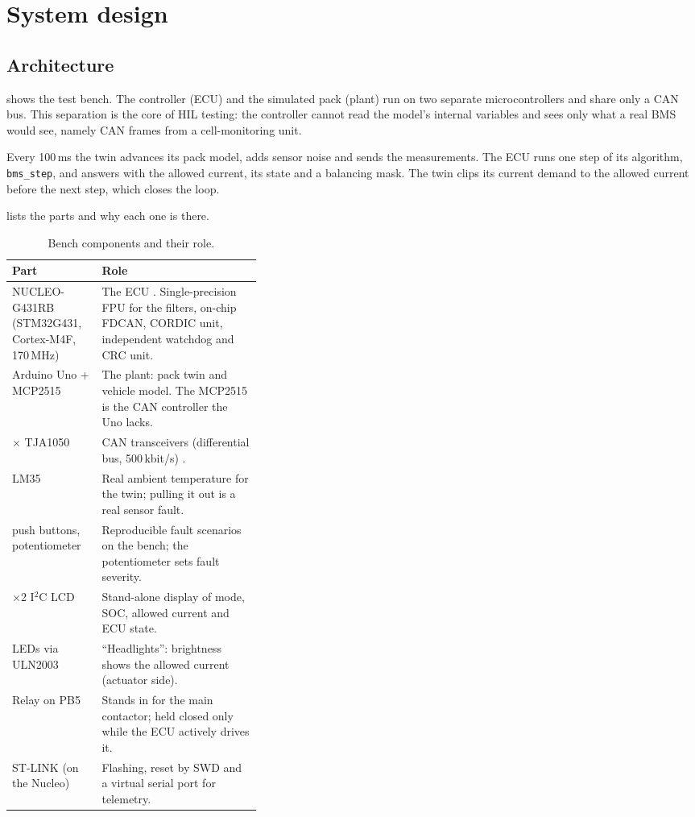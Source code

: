 \chapter{System design}\label{ch:design}

\section{Architecture}
 shows the test bench. The controller (ECU) and the simulated pack (plant) run on two separate microcontrollers and share only a CAN bus. This separation is the core of HIL testing: the controller cannot read the model's internal variables and sees only what a real BMS would see, namely CAN frames from a cell-monitoring unit.


Every 100\,ms the twin advances its pack model, adds sensor noise and sends the measurements. The ECU runs one step of its algorithm, \texttt{bms\_step}, and answers with the allowed current, its state and a balancing mask. The twin clips its current demand to the allowed current before the next step, which closes the loop.

 lists the parts and why each one is there.

\begin{table}[htbp]\centering\small
\caption{Bench components and their role.}\label{tab:hw}
\begin{tabularx}{\linewidth}{@{}>{\raggedright\arraybackslash}p{0.36\linewidth}>{\raggedright\arraybackslash}X@{}}\toprule
Part & Role \\\midrule
NUCLEO-G431RB (STM32G431, Cortex-M4F, 170\,MHz) & The ECU \citep{rm0440,ds12589}. Single-precision FPU for the filters, on-chip FDCAN, CORDIC unit, independent watchdog and CRC unit. \\
Arduino Uno + MCP2515 & The plant: pack twin and vehicle model. The MCP2515 is the CAN controller the Uno lacks. \\
2 $\times$ TJA1050 & CAN transceivers (differential bus, 500\,kbit/s) \citep{tja1050}. \\
LM35 & Real ambient temperature for the twin; pulling it out is a real sensor fault. \\
5 push buttons, potentiometer & Reproducible fault scenarios on the bench; the potentiometer sets fault severity. \\
16$\times$2 I$^2$C LCD & Stand-alone display of mode, SOC, allowed current and ECU state. \\
LEDs via ULN2003 & ``Headlights'': brightness shows the allowed current (actuator side). \\
Relay on PB5 & Stands in for the main contactor; held closed only while the ECU actively drives it. \\
ST-LINK (on the Nucleo) & Flashing, reset by SWD and a virtual serial port for telemetry. \\\bottomrule
\end{tabularx}
\end{table}

